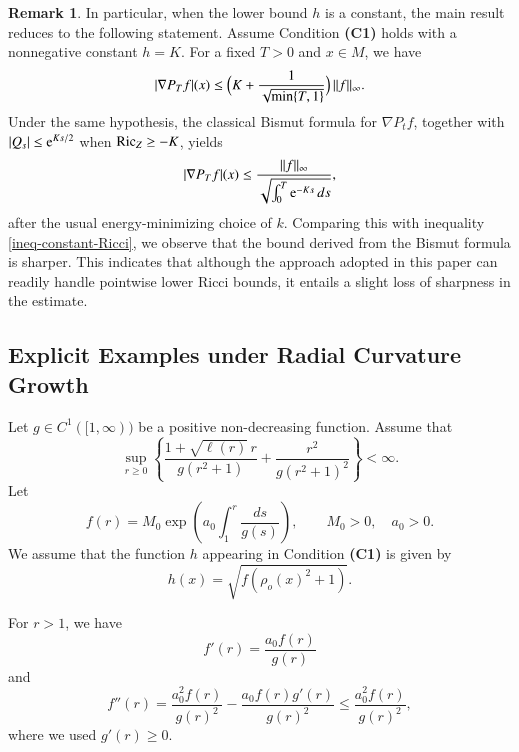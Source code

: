 \documentclass[11pt,twoside, reqno]{article}
\def\e{{\rm e}}
\def\mathpal#1{\mathop{\mathchoice{\text{\rm #1}}%
   {\text{\rm #1}}{\text{\rm #1}}%
   {\text{\rm #1}}}\nolimits}
\newcommand\Ric{\mathpal{Ric}}
\newcommand\1{\mathbbm{1}}
\theoremstyle{definition}
\newtheorem{remark}[theorem]{Remark}
\numberwithin{equation}{section}
\def \e{{\rm e}}
\begin{document}
\begin{remark}
In particular, when the lower bound $h$ is a constant, the main result reduces to the following statement.
Assume Condition \textbf{(C1)} holds with a nonnegative constant $h=K$.
For a fixed $T>0$ and $x\in M$, we have
\begin{align}\label{ineq-constant-Ricci}
|\nabla P_Tf|(x)\leq \Bigl(K +\frac{1}{\sqrt{\min\{T,1\}}} \Bigr)\,\|f\|_{\infty}.
\end{align}
Under the same hypothesis, the classical Bismut formula for $\nabla P_tf$, together with $|Q_s|\le \e^{Ks/2}$ when $\Ric_Z\ge -K$, yields
\begin{align*}
|\nabla P_Tf|(x)\leq \frac{\|f\|_{\infty}}{\sqrt{\int_0^T \e^{-Ks}\, ds}},
\end{align*}
after the usual energy-minimizing choice of $k$. 
Comparing this with inequality \eqref{ineq-constant-Ricci}, we observe that the bound derived from the Bismut formula is sharper.
This indicates that although the approach adopted in this paper can readily handle pointwise lower Ricci bounds, it entails a slight loss of sharpness in the estimate.
\end{remark}

\subsection{Explicit Examples under Radial Curvature Growth}

Let \(g\in C^1([1,\infty))\) be a positive non-decreasing function. Assume
that
\begin{equation}\label{condition-g}
        \sup_{r\geq0}
        \left\{
        \frac{1+\sqrt{\ell(r)}\,r}{g(r^2+1)}
        +
        \frac{r^2}{g(r^2+1)^2}
        \right\}
        <\infty .
\end{equation}
Let
\begin{equation}\label{form-f}
        f(r)
        =
        M_0\exp\left(a_0\int_1^r \frac{ds}{g(s)}\right),
        \qquad
        M_0>0,\quad a_0>0 .
\end{equation}
We assume that the function \(h\) appearing in Condition {\bf(C1)} is given by
\[
        h(x)=\sqrt{f(\rho_o(x)^2+1)}.
\]

For \(r>1\), we have
\[
        f'(r)=\frac{a_0 f(r)}{g(r)}
\]
and
\[
        f''(r)
        =
        \frac{a_0^2 f(r)}{g(r)^2}
        -
        \frac{a_0 f(r)g'(r)}{g(r)^2}
        \leq
        \frac{a_0^2 f(r)}{g(r)^2},
\]
where we used \(g'(r)\geq0\).
\end{document}
